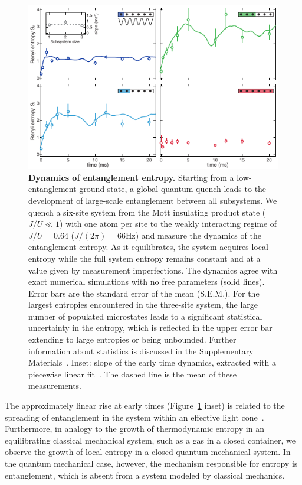 \begin{figure}[t!]
	\centering
	\includegraphics[scale=1.5]{figures/ETH_EE_dynamics.pdf}
	\caption{{\bf Dynamics of entanglement entropy. } Starting from a low-entanglement ground state, a global quantum quench leads to the development of large-scale entanglement between all subsystems. We quench a six-site system from the Mott insulating product state ($J/U\ll 1$) with one atom per site to the weakly interacting regime of $J/U=0.64$ ($J/(2\pi) = 66\mathrm{Hz}$) and measure the dynamics of the entanglement entropy. As it equilibrates, the system acquires local entropy while the full system entropy remains constant and at a value given by measurement imperfections. The dynamics agree with exact numerical simulations with no free parameters (solid lines). Error bars are the standard error of the mean (S.E.M.). For the largest entropies encountered in the three-site system, the large number of populated microstates leads to a significant statistical uncertainty in the entropy, which is reflected in the upper error bar extending to large entropies or being unbounded. Further information about statistics is discussed in the Supplementary Materials~\cite{Supplement}. Inset: slope of the early time dynamics, extracted with a piecewise linear fit~\cite{Supplement}. The dashed line is the mean of these measurements.}
	\label{fig:EEDyn}
\end{figure} 

The approximately linear rise at early times (Figure~\ref{fig:EEDyn} inset) is related to the spreading of entanglement in the system within an effective light cone~\cite{CardyOneD,lightcone,Richerme2014}. Furthermore, in analogy to the growth of thermodynamic entropy in an equilibrating classical mechanical system, such as a gas in a closed container, we observe the growth of local entropy in a closed quantum mechanical system. In the quantum mechanical case, however, the mechanism responsible for entropy is entanglement, which is absent from a system modeled by classical mechanics.

